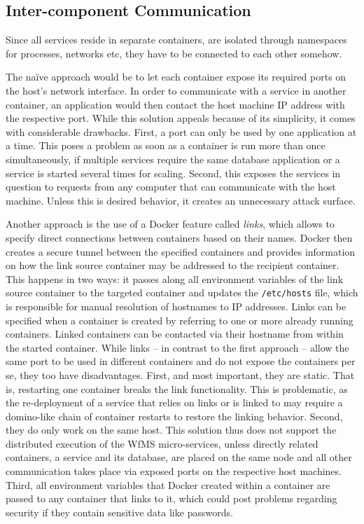 \subsection{Inter-component Communication} %
\label{sub:inter_component_communication}

  Since all services reside in separate containers, \ie are isolated through namespaces for processes, networks etc, they have to be connected to each other somehow.

  The naïve approach would be to let each container expose its required ports on the host's network interface. In order to communicate with a service in another container, an application would then contact the host machine \ac{IP} address with the respective port. While this solution appeals because of its simplicity, it comes with considerable drawbacks.
  First, a port can only be used by one application at a time. This poses a problem as soon as a container is run more than once simultaneously, \eg if multiple services require the same database application or a service is started several times for scaling.
  Second, this exposes the services in question to requests from any computer that can communicate with the host machine. Unless this is desired behavior, it creates an unnecessary attack surface.

  Another approach is the use of a Docker feature called \emph{links}, which allows to specify direct connections between containers based on their names.
  Docker then creates a secure tunnel between the specified containers and provides information on how the link source container may be addressed to the recipient container. This happens in two ways: it passes along all environment variables of the link source container to the targeted container and updates the \texttt{/etc/hosts} file, which is responsible for manual resolution of hostnames to \ac{IP} addresses.
  Links can be specified when a container is created by referring to one or more already running containers.
  Linked containers can be contacted via their hostname from within the started container.
  While links -- in contrast to the first approach -- allow the same port to be used in different containers and do not expose the containers per se, they too have disadvantages.
  First, and most important, they are static. That is, restarting one container breaks the link functionality. This is problematic, as the re-deployment of a service that relies on links or is linked to may require a domino-like chain of container restarts to restore the linking behavior.
  Second, they do only work on the same host. This solution thus does not support the distributed execution of the \ac{WfMS} micro-services, unless directly related containers, \eg a service and its database, are placed on the same node and all other communication takes place via exposed ports on the respective host machines.
  Third, \ac{all} environment variables that Docker created within a container are passed to any container that links to it, which could post problems regarding security if they contain sensitive data like passwords.

